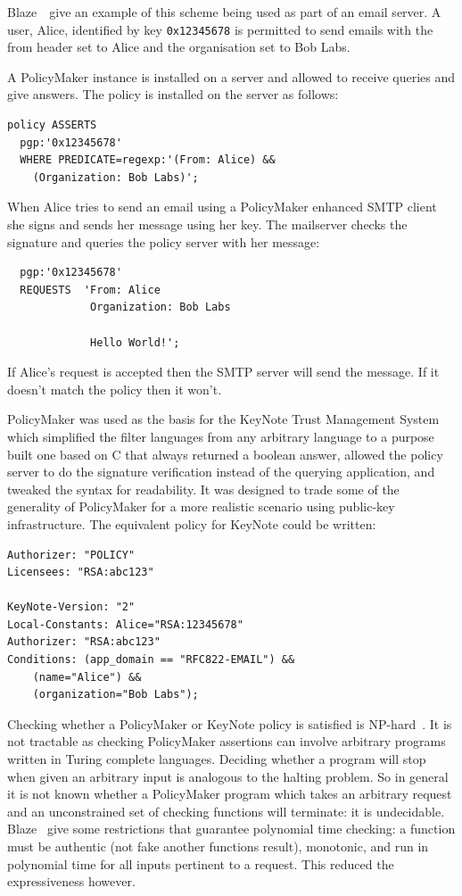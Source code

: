 \documentclass[thesis.tex]{subfiles}
\begin{document}
Blaze~\etal~give an example of this scheme being used as part of an email
server. A user, Alice, identified by key \texttt{0x12345678} is permitted to
send emails with the from header set to Alice and the organisation set to Bob
Labs.

A PolicyMaker instance is installed on a server and allowed to receive queries and give answers.
The policy is installed on the server as follows:

\begin{lstlisting}
policy ASSERTS
  pgp:'0x12345678'
  WHERE PREDICATE=regexp:'(From: Alice) &&
    (Organization: Bob Labs)';
\end{lstlisting}

When Alice tries to send an email using a PolicyMaker enhanced SMTP
client she signs and sends her message using her key.  The mailserver
checks the signature and queries the policy server with her message:

\begin{lstlisting}
  pgp:'0x12345678'
  REQUESTS  'From: Alice
             Organization: Bob Labs

             Hello World!';
\end{lstlisting}

If Alice's request is accepted then the SMTP server will send the
message.  If it doesn't match the policy then it won't.

PolicyMaker was used as the basis for the KeyNote Trust Management
System~\cite{blaze_role_1999,blaze_keynote:_1998} which simplified the
filter languages from any arbitrary language to a purpose built one
based on C that always returned a boolean answer, allowed the policy
server to do the signature verification instead of the querying
application, and tweaked the syntax for readability.  It was designed
to trade some of the generality of PolicyMaker for a more realistic
scenario using public-key infrastructure.  The equivalent policy for KeyNote could be written:

\begin{lstlisting}
Authorizer: "POLICY"
Licensees: "RSA:abc123"

KeyNote-Version: "2"
Local-Constants: Alice="RSA:12345678" 
Authorizer: "RSA:abc123"
Conditions: (app_domain == "RFC822-EMAIL") &&
    (name="Alice") &&
    (organization="Bob Labs");
\end{lstlisting}

Checking whether a PolicyMaker or KeyNote policy is satisfied is
NP-hard~\cite{blaze_compliance_1998}.  It is not tractable as checking
PolicyMaker assertions can involve arbitrary programs written in
Turing complete languages.  Deciding whether a program will stop when
given an arbitrary input is analogous to the halting problem.  So in
general it is not known whether a PolicyMaker program which takes an
arbitrary request and an unconstrained set of checking functions will
terminate: it is undecidable.  Blaze~\etal{} give
some restrictions that guarantee polynomial time checking: a function
must be authentic (not fake another functions result), monotonic, and
run in polynomial time for all inputs pertinent to a request.  This
reduced the expressiveness however.
\end{document}
